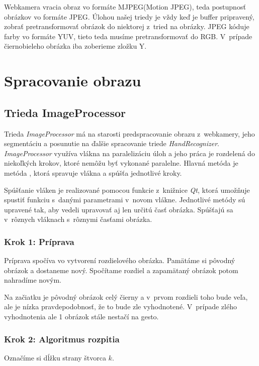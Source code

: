 Webkamera vracia obraz vo formáte MJPEG(Motion JPEG), teda postupnosť obrázkov vo formáte JPEG. Úlohou našej triedy je vždy keď je buffer pripravený, zobrať pretransformovať obrázok do niektorej z~tried na obrázky. JPEG kóduje farby vo formáte YUV, tieto teda musíme pretransformovať do RGB. V~prípade čiernobieleho obrázka iba zoberieme zložku Y.

\section{Spracovanie obrazu}
\label{chap:imageprocess}
\subsection{Trieda ImageProcessor}
Trieda \textit{ImageProcessor} má na starosti predspracovanie obrazu z~webkamery, jeho segmentáciu a posunutie na ďalšie spracovanie triede \textit{HandRecognizer}. \textit{ImageProcessor} využíva vlákna na paralelizáciu úloh a jeho práca je rozdelená do niekoľkých krokov, ktoré nemôžu byť vykonané paralelne. Hlavná metóda je metóda , ktorá spravuje vlákna a spúšťa jednotlivé kroky. 

Spúšťanie vláken je realizované pomocou funkcie  z~knižnice \textit{Qt}, ktorá umožňuje spustiť funkciu s~danými parametrami v~novom vlákne. Jednotlivé metódy sú upravené tak, aby vedeli upravovať aj len určitú časť obrázka. Spúšťajú sa v~rôznych vláknach s~rôznymi časťami obrázka. %

\subsubsection{Krok 1: Príprava}
Príprava spočíva vo vytvorení rozdielového obrázka. Pamätáme si pôvodný obrázok a dostaneme nový. Spočítame rozdiel a zapamätaný obrázok potom nahradíme novým.

Na začiatku je pôvodný obrázok celý čierny a v~prvom rozdieli toho bude veľa, ale je nízka pravdepodobnosť, že to bude zle vyhodnotené. V~prípade zlého vyhodnotenia ale 1 obrázok stále nestačí na gesto.

\subsubsection{Krok 2: Algoritmus rozpitia}
Označíme si dĺžku strany štvorca $k$.

